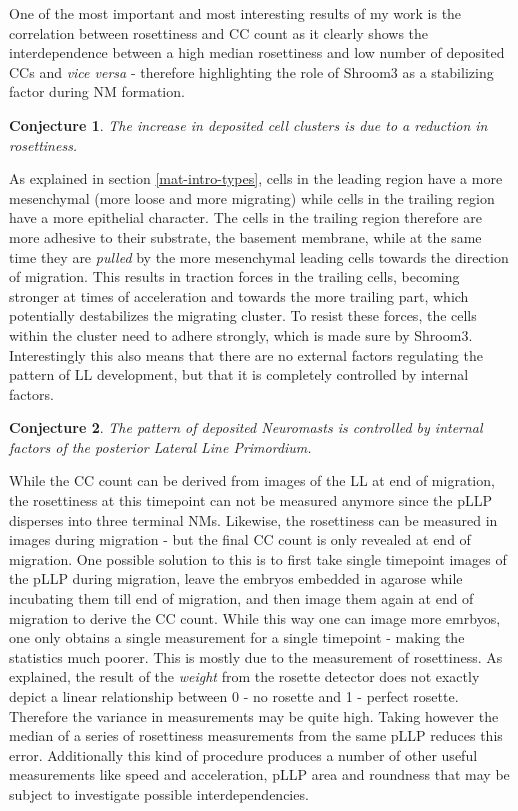 \documentclass[10pt, b5paper, singlespacinge, twoside]{reedthesis} %
\newtheorem{conjecture}{Conjecture}[chapter]
\theoremstyle{definition}
\theoremstyle{definition}
\theoremstyle{definition}
\theoremstyle{remark}
\begin{document}
One of the most important and most interesting results of my work is the correlation between rosettiness and CC count as it clearly shows the interdependence between a high median rosettiness and low number of deposited CCs and \emph{vice versa} - therefore highlighting the role of Shroom3 as a stabilizing factor during NM formation.
\begin{conjecture}
\protect\hypertarget{cnj:unnamed-chunk-13}{}{\label{cnj:unnamed-chunk-13} }The increase in deposited cell clusters is due to a reduction in rosettiness.
\end{conjecture}
As explained in section \ref{mat-intro-types}, cells in the leading region have a more mesenchymal (more loose and more migrating) while cells in the trailing region have a more epithelial character. The cells in the trailing region therefore are more adhesive to their substrate, the basement membrane, while at the same time they are \emph{pulled} by the more mesenchymal leading cells towards the direction of migration. This results in traction forces in the trailing cells, becoming stronger at times of acceleration and towards the more trailing part, which potentially destabilizes the migrating cluster. To resist these forces, the cells within the cluster need to adhere strongly, which is made sure by Shroom3. Interestingly this also means that there are no external factors regulating the pattern of LL development, but that it is completely controlled by internal factors.
\begin{conjecture}
\protect\hypertarget{cnj:unnamed-chunk-14}{}{\label{cnj:unnamed-chunk-14} }The pattern of deposited Neuromasts is controlled by internal factors of the posterior Lateral Line Primordium.
\end{conjecture}
While the CC count can be derived from images of the LL at end of migration, the rosettiness at this timepoint can not be measured anymore since the pLLP disperses into three terminal NMs. Likewise, the rosettiness can be measured in images during migration - but the final CC count is only revealed at end of migration. One possible solution to this is to first take single timepoint images of the pLLP during migration, leave the embryos embedded in agarose while incubating them till end of migration, and then image them again at end of migration to derive the CC count. While this way one can image more emrbyos, one only obtains a single measurement for a single timepoint - making the statistics much poorer. This is mostly due to the measurement of rosettiness. As explained, the result of the \emph{weight} from the rosette detector does not exactly depict a linear relationship between 0 - no rosette and 1 - perfect rosette. Therefore the variance in measurements may be quite high. Taking however the median of a series of rosettiness measurements from the same pLLP reduces this error. Additionally this kind of procedure produces a number of other useful measurements like speed and acceleration, pLLP area and roundness that may be subject to investigate possible interdependencies.
\end{document}
